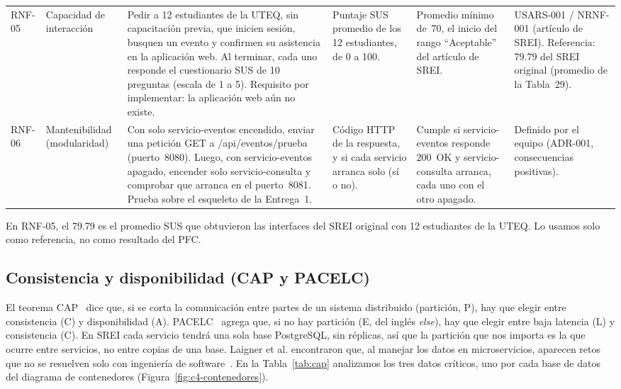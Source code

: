 {\begin{longtable}{p{1.4cm} p{2.5cm} p{3.3cm} p{2.5cm} p{2.3cm} p{2.3cm}}
RNF-05 & Capacidad de interacción & Pedir a 12 estudiantes de la UTEQ, sin capacitación previa, que inicien sesión, busquen un evento y confirmen su asistencia en la aplicación web. Al terminar, cada uno responde el cuestionario SUS de 10 preguntas (escala de 1 a 5). Requisito por implementar: la aplicación web aún no existe. & Puntaje SUS promedio de los 12 estudiantes, de 0 a 100. & Promedio mínimo de~70, el inicio del rango ``Aceptable'' del artículo de SREI. & USARS-001 / NRNF-001 (artículo de SREI). Referencia: 79.79 del SREI original (promedio de la Tabla~29). \\
RNF-06 & Manteni\-bilidad (modularidad) & Con solo servicio-eventos encendido, enviar una petición GET a /api\slash eventos\slash prueba (puerto~8080). Luego, con servicio-eventos apagado, encender solo servicio-consulta y comprobar que arranca en el puerto~8081. Prueba sobre el esqueleto de la Entrega~1. & Código HTTP de la respuesta, y si cada servicio arranca solo (sí o no). & Cumple si servicio-eventos responde 200~OK y servicio-consulta arranca, cada uno con el otro apagado. & Definido por el equipo (\mbox{ADR-001}, consecuencias positivas). \\
\end{longtable}
}

En \mbox{RNF-05}, el 79.79 es el promedio SUS que obtuvieron las interfaces del SREI original con 12 estudiantes de la UTEQ. Lo usamos solo como referencia, no como resultado del PFC.

\subsection{Consistencia y disponibilidad (CAP y PACELC)}
El teorema CAP~\cite{gilbert2002} dice que, si se corta la comunicación entre partes de un sistema distribuido (partición, P), hay que elegir entre consistencia (C) y disponibilidad (A). PACELC~\cite{abadi2012} agrega que, si no hay partición (E, del inglés \emph{else}), hay que elegir entre baja latencia (L) y consistencia (C). En SREI cada servicio tendrá una sola base PostgreSQL, sin réplicas, así que la partición que nos importa es la que ocurre entre servicios, no entre copias de una base. Laigner et al. encontraron que, al manejar los datos en microservicios, aparecen retos que no se resuelven solo con ingeniería de software~\cite{laigner2021}. En la Tabla~\ref{tab:cap} analizamos los tres datos críticos, uno por cada base de datos del diagrama de contenedores (Figura~\ref{fig:c4-contenedores}).

